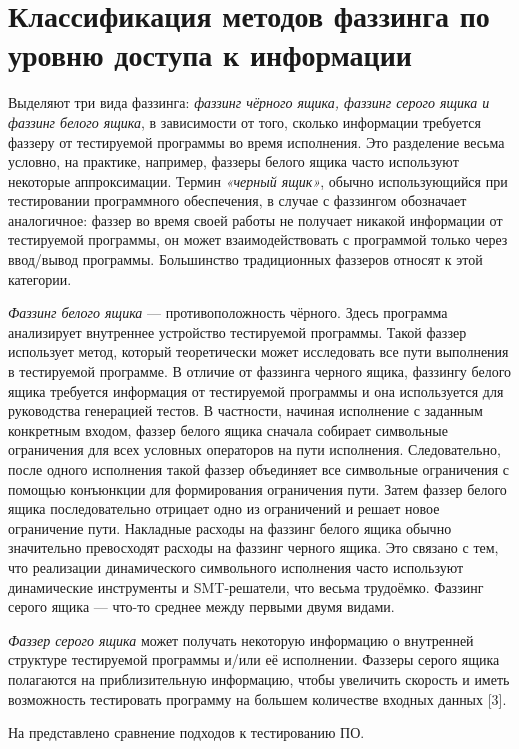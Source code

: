\section{Классификация методов фаззинга по уровню доступа к информации} \label{ch2:sec-abbr} %
	Выделяют три вида фаззинга: \textit{фаззинг чёрного ящика, фаззинг серого ящика и фаззинг белого ящика}, в зависимости от того, сколько информации требуется фаззеру от тестируемой программы во время исполнения. Это разделение весьма условно, на практике, например, фаззеры белого ящика часто используют некоторые аппроксимации. Термин \textit{«черный ящик»}, обычно использующийся при тестировании программного обеспечения, в случае с фаззингом обозначает аналогичное: фаззер во время своей работы не получает никакой информации от тестируемой программы, он может взаимодействовать с программой только через ввод/вывод программы. Большинство традиционных фаззеров относят к этой категории. 
	\par
	\textit{Фаззинг белого ящика} — противоположность чёрного. Здесь программа анализирует внутреннее устройство тестируемой программы.
	Такой фаззер использует метод, который теоретически может исследовать все пути выполнения в тестируемой программе. В отличие от фаззинга черного ящика, фаззингу белого ящика требуется информация от тестируемой программы и она используется для руководства генерацией тестов. В частности, начиная исполнение с заданным конкретным входом, фаззер белого ящика сначала собирает символьные ограничения для всех условных операторов на пути исполнения. Следовательно, после одного исполнения такой фаззер объединяет все символьные ограничения с помощью конъюнкции для формирования ограничения пути. Затем фаззер белого ящика последовательно отрицает одно из ограничений и решает новое ограничение пути. Накладные расходы на фаззинг белого ящика обычно значительно превосходят расходы на фаззинг черного ящика. Это связано с тем, что реализации динамического символьного исполнения часто используют динамические инструменты и SMT-решатели, что весьма трудоёмко. Фаззинг серого ящика — что-то среднее между первыми двумя видами. 
	\par
	\textit{Фаззер серого ящика} может получать некоторую информацию о внутренней структуре тестируемой программы и/или её исполнении. Фаззеры серого ящика полагаются на приблизительную информацию, чтобы увеличить скорость и иметь возможность тестировать программу на большем количестве входных данных [3].
	
	На  представлено сравнение подходов к тестированию ПО.
	
